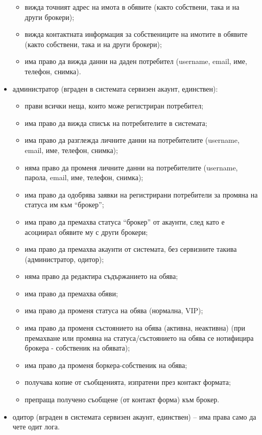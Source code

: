 \documentclass[a4paper]{article}
\begin{document}
\begin{itemize}
{\begin{itemize}
		\item вижда точният адрес на имота в обявите (както собствени, така и на други брокери);
		\item вижда контактната информация за собствениците на имотите в  обявите (както собствени, така и на други брокери);
		\item има право да вижда данни на даден потребител (username, email, име, телефон, снимка).
		\end{itemize}
	}
	\item {администратор (вграден в системата сервизен акаунт, единствен):
		\begin{itemize}
		\item прави всички неща, които може регистриран потребител;
		\item има право да вижда списък на потребителите в системата;
		\item има право да разглежда личните данни на потребителите (username, email, име, телефон, снимка);
		\item няма право да променя личните данни на потребителите (username, парола, email, име, телефон, снимка);
		\item има право да одобрява заявки на регистрирани потребители за промяна на статуса им към ``брокер'';
		\item има право да премахва статуса ``брокер'' от акаунти, след като е асоциирал обявите му с други брокери;
		\item има право да премахва акаунти от системата, без сервизните такива (администратор, одитор);
		\item няма право да редактира съдържанието на обява;
		\item има право да премахва обяви;
		\item има право да променя статуса на обява (нормална, VIP);
		\item има право да променя състоянието на обява (активна, неактивна) (при премахване или промяна на статуса/състоянието на обява се нотифицира брокера - собственик на обявата);
		\item има право да променя боркера-собственик на обява;
		\item получава копие от съобщенията, изпратени през контакт формата;
		\item препраща получено съобщене (от контакт форма) към брокер.
		\end{itemize}
	}
	\item одитор (вграден в системата сервизен акаунт, единствен) -- има права само да чете одит лога.
	\end{itemize}
\end{document}
